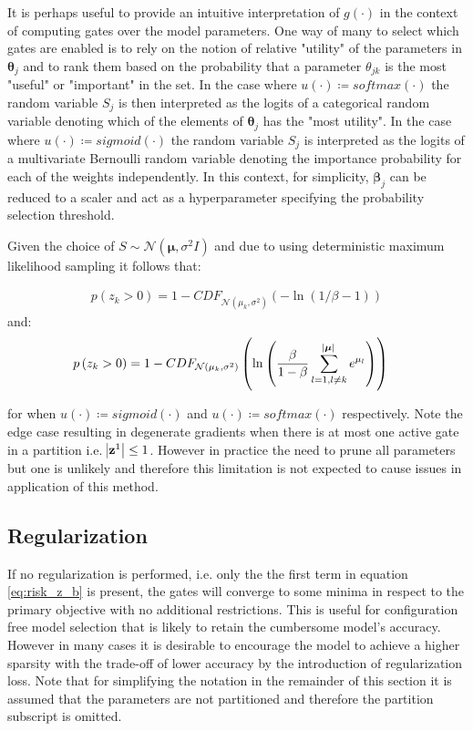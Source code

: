 \documentclass[final,1p,times]{elsarticle}
\begin{document}
It is perhaps useful to provide an intuitive interpretation of $g(\cdot)$ in the context of computing gates over the model parameters. One way of many to select which gates are enabled is to rely on the notion of relative "utility" of the parameters in $\boldsymbol{\theta}_j$ and to rank them based on the probability that a parameter $\theta_{jk}$ is the most "useful" or "important" in the set. In the case where $u(\cdot) \coloneqq softmax(\cdot)$ the random variable $S_j$ is then interpreted as the logits of a categorical random variable denoting which of the elements of $\boldsymbol{\theta}_j$ has the "most utility". In the case where $u(\cdot) \coloneqq sigmoid(\cdot)$ the random variable $S_j$ is interpreted as the logits of a multivariate Bernoulli random variable denoting the importance probability for each of the weights independently. In this context, for simplicity, $\boldsymbol{\beta}_j$ can be reduced to a scaler and act as a hyperparameter specifying the probability selection threshold.

Given the choice of $S \sim \mathcal{N}(\boldsymbol{\mu}, \sigma^2 I)$ and due to using deterministic maximum likelihood sampling it follows that:

\begin{align}
p \left(z_k > 0 \right) = 1 - CDF_{\mathcal{N}(\mu_k, \sigma^2)} \left( - \ln {\left( 1 / \beta - 1 \right) } \right)
\end{align}
and:
\begin{align}
p \left( z_k > 0 \right) & = 1 - CDF_{\mathcal{N}(\mu_k, \sigma^2)} \left( \ln \left( \frac{\beta}{1 - \beta} \sum_{l = 1, l \neq k}^{\abs{\boldsymbol{\mu}}} e^{\mu_l} \right) \right)
\end{align}

for when $u(\cdot) \coloneqq sigmoid(\cdot)$ and $u(\cdot) \coloneqq softmax(\cdot)$ respectively. Note the edge case resulting in degenerate gradients when there is at most one active gate in a partition i.e. $\abs{\mathbf{z}^1} \leq 1$. However in practice the need to prune all parameters but one is unlikely and therefore this limitation is not expected to cause issues in application of this method.

\subsection{Regularization}
If no regularization is performed, i.e. only the the first term in equation \eqref{eq:risk_z_b} is present, the gates will converge to some minima in respect to the primary objective with no additional restrictions. This is useful for configuration free model selection that is likely to retain the cumbersome model's accuracy. However in many cases it is desirable to encourage the model to achieve a higher sparsity with the trade-off of lower accuracy by the introduction of regularization loss. Note that for simplifying the notation in the remainder of this section it is assumed that the parameters are not partitioned and therefore the partition subscript is omitted. \newline
\end{document}
